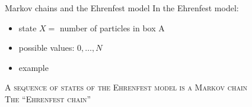 \documentclass[usenames,dvipsnames]{beamer}
\begin{document}
  \begin{frame}{Markov chains and the Ehrenfest model}
    \Large In the Ehrenfest model:
    \normalsize
    \begin{itemize}
      \item<1-> state $X = $ number of particles in box A
      \item<2-> possible values: $0, \dots, N$
      \item<3-> example
    \end{itemize}
    
    \begin{figure}[r]
    \end{figure}
  \end{frame}

  \begin{frame}[standout]
    \textsc{A sequence of states of the Ehrenfest model is a Markov chain}\\
    \vspace{30pt}
    \textsc{The \enquote{Ehrenfest chain}}
  \end{frame}


  




    


  

\end{document}
